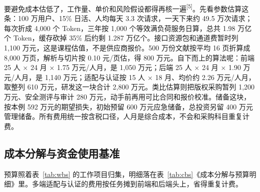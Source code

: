 \documentclass[UTF8,12pt,a4paper]{ctexart}
\begin{document}
要避免成本估低了，工作量、单价和风险假设都得再核一遍\textsuperscript{[5]}。先看参数估算这条：100 万用户、15\% 日活、人均每天 3.3 次请求，一天下来约 49.5 万次请求；每次折成 4,000 个 Token，三年按 1,000 个等效满负荷服务日算，总共 1.98 万亿个 Token，缓存砍掉 35\% 后约剩 1.287 万亿个。接口资源包和通道费暂时列 1,100 万元，这是课程估值，不是供应商报价。500 万份文献按平均 16 页折算成 8,000 万页，解析与切片按 0.10 元/页估，得 800 万元。自下而上的算法呢：前端 25 人 $\times$ 24 月 $\times$ 1.75 万元/人月，是 1,050 万元；后端 25 人 $\times$ 24 月 $\times$ 1.90 万元/人月，是 1,140 万元；适配与认证按 15 人 $\times$ 18 月、均价约 2.26 万元/人月，取整列 610 万元，研发这一块合计 2,800 万元。类比估算则把版权采购暂列 1,200 万元、安全测评与审计 280 万元，动手前再用可比合同和报价校准。储备这块，按本例 592 万元的期望损失，初始预留 600 万元应急储备，总投资另留 400 万元管理储备。所有费用统一按含税口径，人月是综合成本，不会和采购科目重复计费。

\subsection{成本分解与资金使用基准}
预算照着表~\ref{tab:wbs} 的工作项目归集，明细落在表~\ref{tab:cbs}《成本分解与预算明细》里。多端适配与认证的费用按任务摊到前端和后端头上，省得重复计费。
\end{document}
